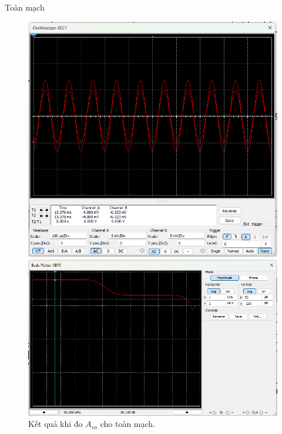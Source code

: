 Toàn mạch
\begin{figure}[H]
	\centering
	\begin{minipage}{.4\linewidth}
		\includegraphics[width=\linewidth]{./my-chapters/my-images/Question5/d_A_Vo.png}
	\end{minipage}
	\begin{minipage}{.4\linewidth}
		\includegraphics[width=\linewidth]{./my-chapters/my-images/Question5/d_A_vo_ketqua.png}
	\end{minipage}
	\caption{Kết quả khi đo $A_{vo}$ cho toàn mạch.}
\end{figure}
